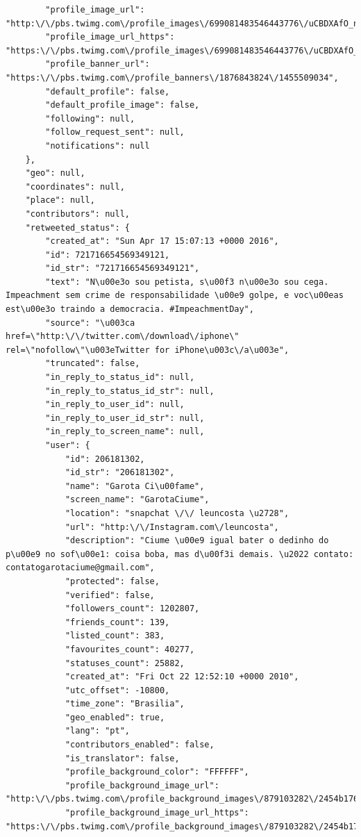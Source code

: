 \begin{lstlisting}
        "profile_image_url": "http:\/\/pbs.twimg.com\/profile_images\/699081483546443776\/uCBDXAfO_normal.jpg",
        "profile_image_url_https": "https:\/\/pbs.twimg.com\/profile_images\/699081483546443776\/uCBDXAfO_normal.jpg",
        "profile_banner_url": "https:\/\/pbs.twimg.com\/profile_banners\/1876843824\/1455509034",
        "default_profile": false,
        "default_profile_image": false,
        "following": null,
        "follow_request_sent": null,
        "notifications": null
    },
    "geo": null,
    "coordinates": null,
    "place": null,
    "contributors": null,
    "retweeted_status": {
        "created_at": "Sun Apr 17 15:07:13 +0000 2016",
        "id": 721716654569349121,
        "id_str": "721716654569349121",
        "text": "N\u00e3o sou petista, s\u00f3 n\u00e3o sou cega. Impeachment sem crime de responsabilidade \u00e9 golpe, e voc\u00eas est\u00e3o traindo a democracia. #ImpeachmentDay",
        "source": "\u003ca href=\"http:\/\/twitter.com\/download\/iphone\" rel=\"nofollow\"\u003eTwitter for iPhone\u003c\/a\u003e",
        "truncated": false,
        "in_reply_to_status_id": null,
        "in_reply_to_status_id_str": null,
        "in_reply_to_user_id": null,
        "in_reply_to_user_id_str": null,
        "in_reply_to_screen_name": null,
        "user": {
            "id": 206181302,
            "id_str": "206181302",
            "name": "Garota Ci\u00fame",
            "screen_name": "GarotaCiume",
            "location": "snapchat \/\/ leuncosta \u2728",
            "url": "http:\/\/Instagram.com\/leuncosta",
            "description": "Ciume \u00e9 igual bater o dedinho do p\u00e9 no sof\u00e1: coisa boba, mas d\u00f3i demais. \u2022 contato: contatogarotaciume@gmail.com",
            "protected": false,
            "verified": false,
            "followers_count": 1202807,
            "friends_count": 139,
            "listed_count": 383,
            "favourites_count": 40277,
            "statuses_count": 25882,
            "created_at": "Fri Oct 22 12:52:10 +0000 2010",
            "utc_offset": -10800,
            "time_zone": "Brasilia",
            "geo_enabled": true,
            "lang": "pt",
            "contributors_enabled": false,
            "is_translator": false,
            "profile_background_color": "FFFFFF",
            "profile_background_image_url": "http:\/\/pbs.twimg.com\/profile_background_images\/879103282\/2454b176f3fffc4b100fb2bc64b1f2b5.png",
            "profile_background_image_url_https": "https:\/\/pbs.twimg.com\/profile_background_images\/879103282\/2454b176f3fffc4b100fb2bc64b1f2b5.png",

\end{lstlisting}
